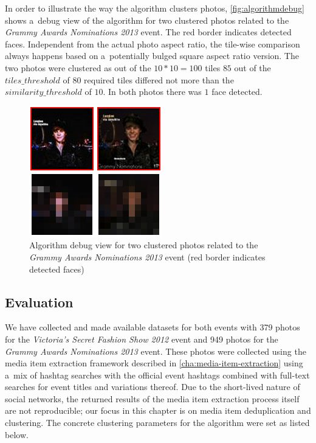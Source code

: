 In order to illustrate the way the algorithm clusters photos,
\autoref{fig:algorithmdebug} shows a~debug view of the algorithm
for two clustered photos related to the 
\emph{Grammy Awards Nominations 2013} event.
The red border indicates detected faces.
Independent from the actual photo aspect ratio,
the tile-wise comparison always happens based on a~potentially bulged
square aspect ratio version.
The two photos were clustered as out of the $10 * 10 = 100$ tiles
$85$ out of the $tiles\_threshold$ of $80$ required tiles
differed not more than the $similarity\_threshold$ of $10$.
In both photos there was $1$ face detected.

\begin{figure}[h!]
  \centering
  \includegraphics[width=0.5\linewidth]{./algorithmdebug.png}
  \caption[Algorithm debug view for two clustered photos]
  {Algorithm debug view for two clustered photos related to the \emph{Grammy Awards Nominations 2013} event (red border indicates detected faces)}
  \label{fig:algorithmdebug}
\end{figure}

\subsection{Evaluation}\label{sec:evaluation-chpater6}

We have collected and made available 
datasets for both events with
379 photos for the \emph{Victoria's Secret Fashion Show 2012} event 
and 949 photos for the \emph{Grammy Awards Nominations 2013} event.
These photos were collected using the media item extraction framework
described in \autoref{cha:media-item-extraction}
using a~mix of hashtag searches with the official event hashtags combined
with full-text searches for event titles and variations thereof.
Due to the short-lived nature of social networks,
the returned results of the media item extraction process itself
are not reproducible; our focus in this chapter
is on media item deduplication and clustering.
The concrete clustering parameters for the algorithm were set as listed below.

